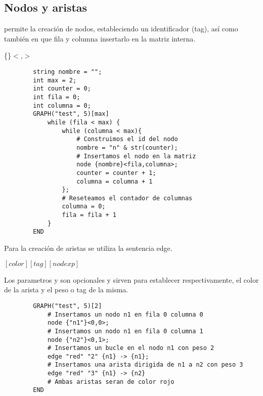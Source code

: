 \documentclass{article}
\begin{document}
    \subsection{Nodos y aristas}
     permite la creación de nodos, estableciendo un identificador (tag), así como también 
    en que fila y columna insertarlo en la matriz interna.
    \begin{center}
        \{\}$<$,$>$
    \end{center}
    \begin{lstlisting}
        string nombre = "";
        int max = 2;
        int counter = 0;
        int fila = 0;
        int columna = 0;
        GRAPH("test", 5)[max]
            while (fila < max) {
                while (columna < max){
                    # Construimos el id del nodo
                    nombre = "n" & str(counter);
                    # Insertamos el nodo en la matriz
                    node {nombre}<fila,columna>;
                    counter = counter + 1;
                    columna = columna + 1
                };
                # Reseteamos el contador de columnas
                columna = 0;
                fila = fila + 1
            }
        END
    \end{lstlisting}
    Para la creación de aristas se utiliza la sentencia edge. 
    \begin{center}
         $\left[color\right] \left[tag\right]  \left[nodexp\right]$
    \end{center}
    Los parametros  y  son opcionales y sirven para establecer respectivamente, 
    el color de la arista y el peso o tag de la misma.
    \begin{lstlisting}
        GRAPH("test", 5)[2]
            # Insertamos un nodo n1 en fila 0 columna 0
            node {"n1"}<0,0>;
            # Insertamos un nodo n1 en fila 0 columna 1
            node {"n2"}<0,1>;
            # Insertamos un bucle en el nodo n1 con peso 2
            edge "red" "2" {n1} -> {n1};
            # Insertamos una arista dirigida de n1 a n2 con peso 3
            edge "red" "3" {n1} -> {n2}
            # Ambas aristas seran de color rojo
        END
    \end{lstlisting}

    \newpage
\end{document}
